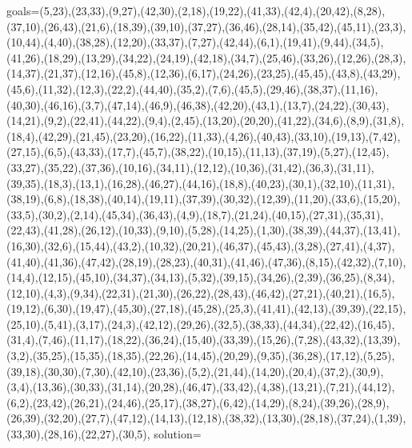 goals=(5,23),(23,33),(9,27),(42,30),(2,18),(19,22),(41,33),(42,4),(20,42),(8,28),(37,10),(26,43),(21,6),(18,39),(39,10),(37,27),(36,46),(28,14),(35,42),(45,11),(23,3),(10,44),(4,40),(38,28),(12,20),(33,37),(7,27),(42,44),(6,1),(19,41),(9,44),(34,5),(41,26),(18,29),(13,29),(34,22),(24,19),(42,18),(34,7),(25,46),(33,26),(12,26),(28,3),(14,37),(21,37),(12,16),(45,8),(12,36),(6,17),(24,26),(23,25),(45,45),(43,8),(43,29),(45,6),(11,32),(12,3),(22,2),(44,40),(35,2),(7,6),(45,5),(29,46),(38,37),(11,16),(40,30),(46,16),(3,7),(47,14),(46,9),(46,38),(42,20),(43,1),(13,7),(24,22),(30,43),(14,21),(9,2),(22,41),(44,22),(9,4),(2,45),(13,20),(20,20),(41,22),(34,6),(8,9),(31,8),(18,4),(42,29),(21,45),(23,20),(16,22),(11,33),(4,26),(40,43),(33,10),(19,13),(7,42),(27,15),(6,5),(43,33),(17,7),(45,7),(38,22),(10,15),(11,13),(37,19),(5,27),(12,45),(33,27),(35,22),(37,36),(10,16),(34,11),(12,12),(10,36),(31,42),(36,3),(31,11),(39,35),(18,3),(13,1),(16,28),(46,27),(44,16),(18,8),(40,23),(30,1),(32,10),(11,31),(38,19),(6,8),(18,38),(40,14),(19,11),(37,39),(30,32),(12,39),(11,20),(33,6),(15,20),(33,5),(30,2),(2,14),(45,34),(36,43),(4,9),(18,7),(21,24),(40,15),(27,31),(35,31),(22,43),(41,28),(26,12),(10,33),(9,10),(5,28),(14,25),(1,30),(38,39),(44,37),(13,41),(16,30),(32,6),(15,44),(43,2),(10,32),(20,21),(46,37),(45,43),(3,28),(27,41),(4,37),(41,40),(41,36),(47,42),(28,19),(28,23),(40,31),(41,46),(47,36),(8,15),(42,32),(7,10),(14,4),(12,15),(45,10),(34,37),(34,13),(5,32),(39,15),(34,26),(2,39),(36,25),(8,34),(12,10),(4,3),(9,34),(22,31),(21,30),(26,22),(28,43),(46,42),(27,21),(40,21),(16,5),(19,12),(6,30),(19,47),(45,30),(27,18),(45,28),(25,3),(41,41),(42,13),(39,39),(22,15),(25,10),(5,41),(3,17),(24,3),(42,12),(29,26),(32,5),(38,33),(44,34),(22,42),(16,45),(31,4),(7,46),(11,17),(18,22),(36,24),(15,40),(33,39),(15,26),(7,28),(43,32),(13,39),(3,2),(35,25),(15,35),(18,35),(22,26),(14,45),(20,29),(9,35),(36,28),(17,12),(5,25),(39,18),(30,30),(7,30),(42,10),(23,36),(5,2),(21,44),(14,20),(20,4),(37,2),(30,9),(3,4),(13,36),(30,33),(31,14),(20,28),(46,47),(33,42),(4,38),(13,21),(7,21),(44,12),(6,2),(23,42),(26,21),(24,46),(25,17),(38,27),(6,42),(14,29),(8,24),(39,26),(28,9),(26,39),(32,20),(27,7),(47,12),(14,13),(12,18),(38,32),(13,30),(28,18),(37,24),(1,39),(33,30),(28,16),(22,27),(30,5),
solution=
